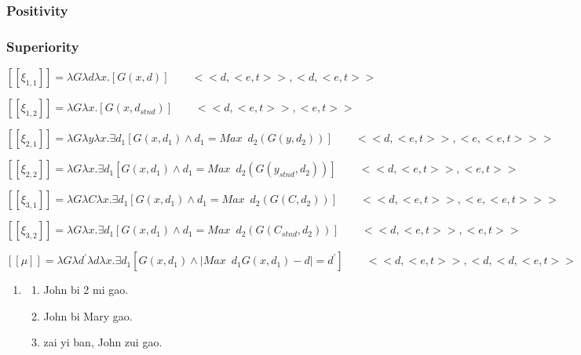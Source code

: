 \documentclass{ctexart}
\begin{document}
\subsubsection{Positivity}





\subsubsection{Superiority}



$[\![\xi_{1,1}]\!]=\lambda G \lambda d \lambda x .[G(x,d)] \qquad <<d,<e,t>>,<d,<e,t>>$


$[\![\xi_{1,2}]\!]=\lambda G \lambda x .[G(x,d_{stnd})] \qquad <<d,<e,t>>,<e,t>>$

$[\![\xi_{2,1}]\!]=\lambda G \lambda y \lambda x . \exists d_1 [G(x,d_1) \land d_1=Max \enspace d_2(G(y,d_2))] \qquad <<d,<e,t>>,<e,<e,t>>>$

$[\![\xi_{2,2}]\!]=\lambda G \lambda x . \exists d_1 [G(x,d_1) \land d_1=Max \enspace d_2(G(y_{stnd},d_2))] \qquad <<d,<e,t>>,<e,t>>$

$[\![\xi_{3,1}]\!]=\lambda G \lambda C \lambda x . \exists d_1 [G(x,d_1) \land d_1=Max \enspace d_2(G(C,d_2))] \qquad <<d,<e,t>>,<e,<e,t>>>$

$[\![\xi_{3,2}]\!]=\lambda G \lambda x . \exists d_1 [G(x,d_1) \land d_1=Max \enspace d_2(G(C_{stnd},d_2))] \qquad <<d,<e,t>>,<e,t>>$


$[\![\mu]\!]=\lambda G \lambda d^{\prime} \lambda d \lambda x. \exists d_1[G(x, d_1) \land | Max \enspace d_1 G(x,d_1)-d | =d^{\prime}] \qquad <<d,<e,t>>, <d,<d,<e,t>>>>$





\begin{enumerate}
    \item
    \begin{enumerate}
        \item John bi 2 mi gao.
        \item John bi Mary gao.
        \item zai yi ban, John zui gao.
    \end{enumerate}
\end{enumerate}
\end{document}
